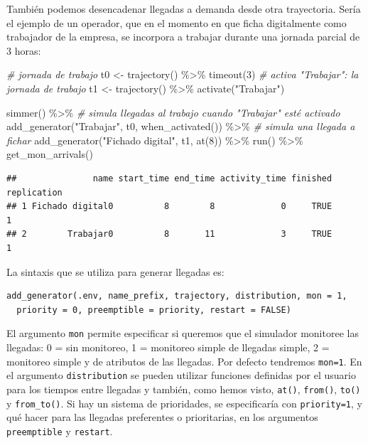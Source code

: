 \documentclass[
]{book}
\newenvironment{Shaded}{\begin{snugshade}}{\end{snugshade}}
\newcommand{\CommentTok}[1]{\textcolor[rgb]{0.56,0.35,0.01}{\textit{#1}}}
\newcommand{\DecValTok}[1]{\textcolor[rgb]{0.00,0.00,0.81}{#1}}
\newcommand{\FunctionTok}[1]{\textcolor[rgb]{0.00,0.00,0.00}{#1}}
\newcommand{\NormalTok}[1]{#1}
\newcommand{\OtherTok}[1]{\textcolor[rgb]{0.56,0.35,0.01}{#1}}
\newcommand{\SpecialCharTok}[1]{\textcolor[rgb]{0.00,0.00,0.00}{#1}}
\newcommand{\StringTok}[1]{\textcolor[rgb]{0.31,0.60,0.02}{#1}}
\theoremstyle{definition}
\theoremstyle{definition}
\theoremstyle{definition}
\theoremstyle{definition}
\theoremstyle{remark}
\begin{document}
También podemos desencadenar llegadas a demanda desde otra trayectoria. Sería el ejemplo de un operador, que en el momento en que ficha digitalmente como trabajador de la empresa, se incorpora a trabajar durante una jornada parcial de 3 horas:

\begin{Shaded}
\begin{Highlighting}[]
\CommentTok{\# jornada de trabajo}
\NormalTok{t0 }\OtherTok{\textless{}{-}} \FunctionTok{trajectory}\NormalTok{() }\SpecialCharTok{\%\textgreater{}\%}
  \FunctionTok{timeout}\NormalTok{(}\DecValTok{3}\NormalTok{)}
\CommentTok{\# activa "Trabajar": la jornada de trabajo}
\NormalTok{t1 }\OtherTok{\textless{}{-}} \FunctionTok{trajectory}\NormalTok{() }\SpecialCharTok{\%\textgreater{}\%}
  \FunctionTok{activate}\NormalTok{(}\StringTok{"Trabajar"}\NormalTok{)}

\FunctionTok{simmer}\NormalTok{() }\SpecialCharTok{\%\textgreater{}\%}
  \CommentTok{\# simula llegadas al trabajo cuando "Trabajar" esté activado}
  \FunctionTok{add\_generator}\NormalTok{(}\StringTok{"Trabajar"}\NormalTok{, t0, }\FunctionTok{when\_activated}\NormalTok{()) }\SpecialCharTok{\%\textgreater{}\%}
  \CommentTok{\# simula una llegada a fichar}
  \FunctionTok{add\_generator}\NormalTok{(}\StringTok{"Fichado digital"}\NormalTok{, t1, }\FunctionTok{at}\NormalTok{(}\DecValTok{8}\NormalTok{)) }\SpecialCharTok{\%\textgreater{}\%}
  \FunctionTok{run}\NormalTok{() }\SpecialCharTok{\%\textgreater{}\%}
  \FunctionTok{get\_mon\_arrivals}\NormalTok{()}
\end{Highlighting}
\end{Shaded}

\begin{verbatim}
##               name start_time end_time activity_time finished replication
## 1 Fichado digital0          8        8             0     TRUE           1
## 2        Trabajar0          8       11             3     TRUE           1
\end{verbatim}

La sintaxis que se utiliza para generar llegadas es:

\begin{verbatim}
add_generator(.env, name_prefix, trajectory, distribution, mon = 1,
  priority = 0, preemptible = priority, restart = FALSE)
\end{verbatim}

El argumento \texttt{mon} permite especificar si queremos que el simulador monitoree las llegadas: 0 = sin monitoreo, 1 = monitoreo simple de llegadas simple, 2 = monitoreo simple y de atributos de las llegadas. Por defecto tendremos \texttt{mon=1}. En el argumento \texttt{distribution} se pueden utilizar funciones definidas por el usuario para los tiempos entre llegadas y también, como hemos visto, \texttt{at()}, \texttt{from()}, \texttt{to()} y \texttt{from\_to()}. Si hay un sistema de prioridades, se especificaría con \texttt{priority=1}, y qué hacer para las llegadas preferentes o prioritarias, en los argumentos \texttt{preemptible} y \texttt{restart}.
\end{document}
